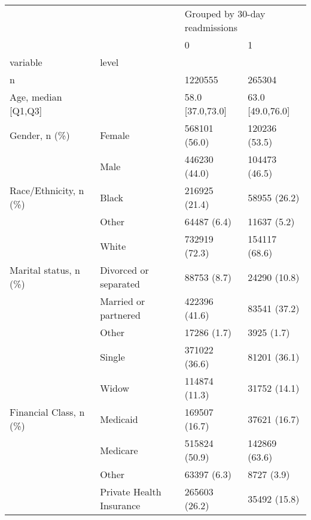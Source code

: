 \begin{tabular}{llll}
\toprule
                                       &   & \multicolumn{2}{l}{Grouped by 30-day readmissions} \\
                                       &   &                              0 &                 1 \\
variable & level &                                &                   \\
\midrule
n &   &                        1220555 &            265304 \\
Age, median [Q1,Q3] &   &               58.0 [37.0,73.0] &  63.0 [49.0,76.0] \\
Gender, n (\%) & Female &                  568101 (56.0) &     120236 (53.5) \\
                                       & Male &                  446230 (44.0) &     104473 (46.5) \\
Race/Ethnicity, n (\%) & Black &                  216925 (21.4) &      58955 (26.2) \\
                                       & Other &                    64487 (6.4) &       11637 (5.2) \\
                                       & White &                  732919 (72.3) &     154117 (68.6) \\
Marital status, n (\%) & Divorced or separated &                    88753 (8.7) &      24290 (10.8) \\
                                       & Married or partnered &                  422396 (41.6) &      83541 (37.2) \\
                                       & Other &                    17286 (1.7) &        3925 (1.7) \\
                                       & Single &                  371022 (36.6) &      81201 (36.1) \\
                                       & Widow &                  114874 (11.3) &      31752 (14.1) \\
Financial Class, n (\%) & Medicaid &                  169507 (16.7) &      37621 (16.7) \\
                                       & Medicare &                  515824 (50.9) &     142869 (63.6) \\
                                       & Other &                    63397 (6.3) &        8727 (3.9) \\
                                       & Private Health Insurance &                  265603 (26.2) &      35492 (15.8) \\

\end{tabular}
